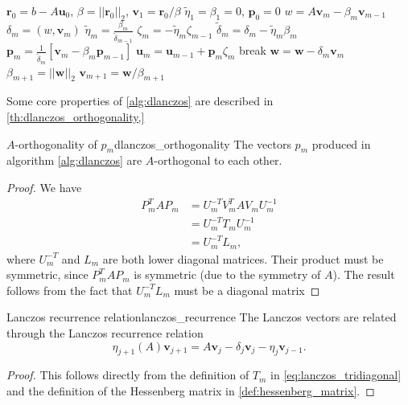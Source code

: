 \begin{algorithm}[H]
  \caption{D-Lanczos \cite[Algorithm 6.17]{iter_method_saad}}
  \begin{algorithmic}
    \State $\mathbf{r}_0 = b - A\mathbf{u}_0$, $\beta = ||\mathbf{r}_0||_2$, $\mathbf{v}_1 = \mathbf{r}_0 / \beta$
    \State $\tilde{\eta}_1 = \beta_1 = 0$, $\mathbf{p}_0 = 0$
    \State $w = A\mathbf{v}_m - \beta_m \mathbf{v}_{m-1}$
    \State $\delta_m = (w, \mathbf{v}_m)$
    \State $\tilde{\eta}_m = \frac{\beta_m}{\tilde{\delta}_{m-1}}$
    \State $\zeta_m = -\tilde{\eta}_m \zeta_{m-1}$
    \EndIf
    \State $\tilde{\delta}_m = \delta_m - \tilde{\eta}_m \beta_m$
    \State $\mathbf{p}_m = \frac{1}{\tilde{\delta}_m}\left[\mathbf{v}_m - \beta_m \mathbf{p}_{m-1}\right]$
    \State $\mathbf{u}_m = \mathbf{u}_{m-1} + \mathbf{p}_m \zeta_m$
    \State break
    \EndIf
    \State $\mathbf{w} = \mathbf{w} - \delta_m \mathbf{v}_m$
    \State $\beta_{m+1} = ||\mathbf{w}||_2$
    \State $\mathbf{v}_{m+1} = \mathbf{w} / \beta_{m+1}$
    \EndFor
  \end{algorithmic}
  \label{alg:dlanczos}
\end{algorithm}
Some core properties of \cref{alg:dlanczos} are described in \cref{th:dlanczos_orthogonality,}
\begin{APPfancyth}{$A$-orthogonality of $p_m$}{dlanczos_orthogonality}
  The vectors $p_m$ produced in algorithm \cref{alg:dlanczos} are $A$-orthogonal to each other.
\end{APPfancyth}
\begin{proof}
  We have
  \begin{align*}
    P^T_m A P_m & = U_m^{-T} V_m^T A V_m U_m^{-1} \\
                & = U_m^{-T} T_m U_m^{-1}         \\
                & = U_m^{-T} L_m,
  \end{align*}
  where $U_m^{-T}$ and $L_m$ are both lower diagonal matrices. Their product must be symmetric, since $P^T_m A P_m$ is symmetric (due to the symmetry of $A$). The result follows from the fact that $U_m^{-T} L_m$ must be a diagonal matrix
\end{proof}
\begin{APPfancyth}{Lanczos recurrence relation}{lanczos_recurrence}
  The Lanczos vectors are related through the Lanczos recurrence relation
  \begin{equation}
    \label{eq:lanczos_recurrence}
    \eta_{j+1}(A)\mathbf{v}_{j+1} = A \mathbf{v}_j - \delta_j \mathbf{v}_j - \eta_j \mathbf{v}_{j-1}.
  \end{equation}
\end{APPfancyth}
\begin{proof}
  This follows directly from the definition of $T_m$ in \cref{eq:lanczos_tridiagonal} and the definition of the Hessenberg matrix in \cref{def:hessenberg_matrix}.  
\end{proof}

